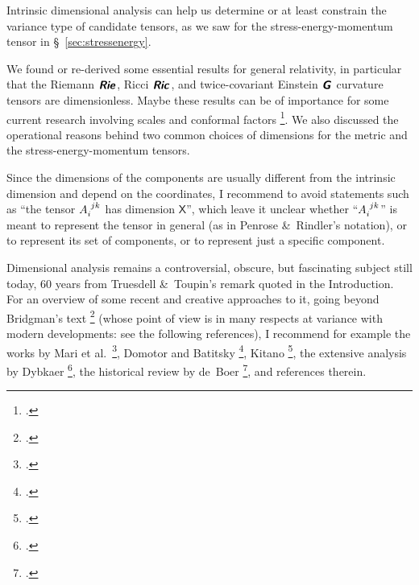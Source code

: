 \documentclass[\ifafour a4paper,12pt,\else a5paper,10pt,\fi%
onecolumn,oneside,article,%
british%
]{memoir}
\makeatletter
\theoremstyle{remark}
\theoremstyle{innote}
\newcommand*{\mathte}[1]{\textbf{\textit{\textsf{#1}}}}
\newcommand*{\citep}{\footcites}
\newcommand*{\amp}{\&}
\renewcommand*{\|}[1][]{\nonscript\,#1\vert\nonscript\;\mathopen{}}
\newcommand*{\sect}{\S}%
\newcommand*{\chap}{ch.}%
\newcommand*{\eqn}{eq.}%
\newcommand*{\eqns}{eqs}%
\newcommand*{\eg}{{e.g.}}
\newcommand*{\etal}{{et al.}}
\newcommand*{\q}{}%
\DeclareRobustCommand*{\q}{%
  \mathbin{\mathpalette\bigcdot@{}}%
}
\newcommand*{\bigcdot@scalefactor}{0.7}
\newcommand*{\bigcdot@widthfactor}{1.5}
\newcommand*{\bigcdot@}[2]{%
  \sbox0{$#1\vcenter{}$}%
  \sbox2{$#1\cdot\m@th$}%
  \hbox to \bigcdot@widthfactor\wd2{%
    \hfil
    \raise\ht0\hbox{%
      \scalebox{\bigcdot@scalefactor}{%
        \lower\ht0\hbox{$#1\bullet\m@th$}%
      }%
    }%
    \hfil
  }%
}
\newcommand*{\Xx}{\textsf{X}}
\newcommand*{\yG}{\mathte{G}}
\newcommand*{\yR}{\mathte{Rie}}
\newcommand*{\yRi}{\mathte{Ric}}
\renewcommand*{\i}{\indices}
\makeatother
\begin{document}
Intrinsic dimensional analysis can help us determine or at least constrain
the variance type of candidate tensors, as we saw for the
stress-energy-momentum tensor in \sect~\ref{sec:stressenergy}.

We found or re-derived some essential results for general relativity, in
particular that the Riemann $\yR\i{^{\q}_{\q\q\q}}$, Ricci
$\yRi\i{_{\q\q}}$, and twice-covariant Einstein $\yG\i{_{\q\q}}$ curvature
tensors are dimensionless. Maybe these results can be of importance for
some current research involving scales and conformal factors
\citep[\eg][]{roehretal2005,cadonietal2019}. We also discussed the
operational reasons behind two common choices of dimensions for the metric
and the stress-energy-momentum tensors.

Since the dimensions of the components are usually different from the
intrinsic dimension and depend on the coordinates, I recommend to avoid
statements such as \enquote{the tensor $A\i{_{i}^{jk}}$ has dimension
  $\Xx$}, which leave it unclear whether \enquote{$A\i{_{i}^{jk}}$} is
meant to represent the tensor in general (as in Penrose \amp\ Rindler's
notation), or to represent its set of components, or to represent just a
specific component.


\medskip

Dimensional analysis remains a controversial, obscure, but fascinating
subject still today, 60 years from Truesdell \amp\ Toupin's remark quoted
in the Introduction. For an overview of some recent and creative approaches
to it, going beyond Bridgman's text \citep{bridgman1922_r1963} (whose point
of view is in many respects at variance with modern developments: see the
following references), I recommend for example the works by Mari \etal\
\citep{marietal2012,frigerioetal2010}, Domotor and Batitsky
\citep{domotor2017,domotoretal2016,domotor2012}, Kitano \citep{kitano2013},
the extensive analysis by Dybkaer \citep{dybkaer2004_r2010}, the historical
review by de~Boer \citep{deboer1995}, and references therein.





\end{document}
